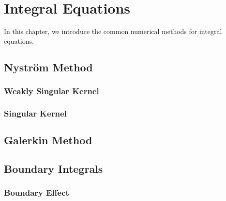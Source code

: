 \chapter{Integral Equations}
In this chapter, we introduce the common numerical methods for integral equations.  
\section{Nystr\"om Method}
\subsection{Weakly Singular Kernel}
\subsection{Singular Kernel}

\section{Galerkin Method}

\section{Boundary Integrals}
\subsection{Boundary Effect}